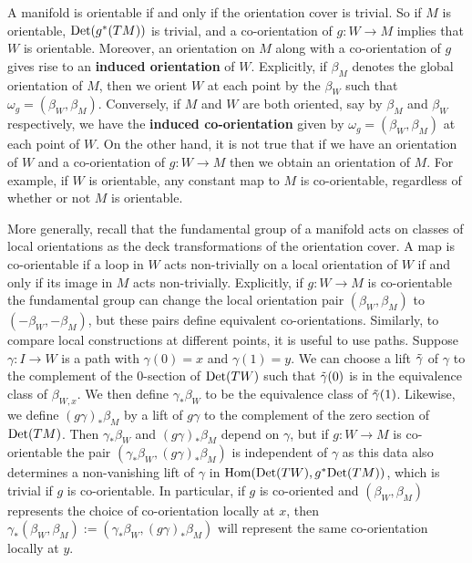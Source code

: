 A manifold is orientable if and only if the orientation cover is trivial.
So if $M$ is orientable, ${\rm Det}(g^*(TM))$ is trivial, and a co-orientation
of $g: W \to M$ implies that $W$ is orientable.
Moreover, an orientation on $M$ along with a co-orientation of $g$ gives rise to an \textbf{induced orientation} of $W$.
Explicitly, if $\beta_M$ denotes the global orientation of $M$, then we orient $W$ at each point by the $\beta_W$ such that $\omega_g=(\beta_W,\beta_M)$.
Conversely, if $M$ and $W$ are both oriented, say by $\beta_M$ and $\beta_W$ respectively, we have the \textbf{induced co-orientation} given by $\omega_g=(\beta_W,\beta_M)$ at each point of $W$.
On the other hand, it is not true that if we have an orientation of $W$ and a co-orientation of $g \colon W \to M$ then we obtain an orientation of $M$.
For example, if $W$ is orientable, any constant map to $M$ is co-orientable, regardless of whether or not $M$ is orientable.

More generally, recall that the fundamental group
of a manifold acts on classes of local orientations as the deck transformations of the orientation cover.
A map is co-orientable if a loop in $W$ acts non-trivially on a local orientation of $W$ if and only if
its image in $M$ acts non-trivially.
Explicitly, if $g \colon W \to M$ is co-orientable the fundamental group can change the local orientation pair
$(\beta_W, \beta_M)$ to $(-\beta_W, -\beta_M)$, but these pairs define equivalent co-orientations.
Similarly, to compare local constructions at different points, it is useful to use paths.
Suppose $\gamma:I\to W$ is a path with $\gamma(0)=x$ and $\gamma(1)=y$.
We can choose a lift $\tilde \gamma$ of $\gamma$ to the complement of the $0$-section of ${\rm Det}(TW)$ such that $\tilde \gamma(0)$ is in the equivalence class of $\beta_{W,x}$.
We then define $\gamma_*\beta_{W}$ to be the equivalence class of $\tilde \gamma(1)$.
Likewise, we define $(g\gamma)_*\beta_M$ by a lift of $g\gamma$ to the complement of the zero section of ${\rm Det}(TM)$.
Then $\gamma_*\beta_{W}$ and $(g\gamma)_*\beta_M$ depend on $\gamma$, but if $g \colon W \to M$ is co-orientable the pair $(\gamma_*\beta_{W}, (g\gamma)_*\beta_M)$ is independent of $\gamma$ as this data also determines a non-vanishing lift of $\gamma$ in $\textup{Hom}({\rm Det}(TW),g^*{\rm Det}(TM))$, which is trivial if $g$ is co-orientable.
In particular, if $g$ is co-oriented and $(\beta_{W}, \beta_M)$ represents the choice of co-orientation locally at $x$, then $\gamma_*(\beta_W,\beta_M):=(\gamma_*\beta_{W}, (g\gamma)_*\beta_M)$ will represent the same co-orientation locally at $y$.

